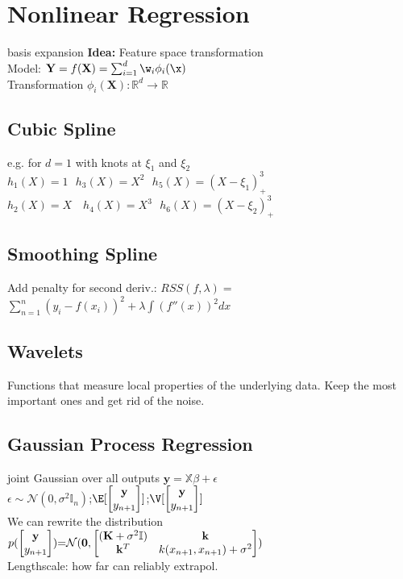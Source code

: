 \section*{Nonlinear Regression}
basis expansion
\textbf{Idea:} Feature space transformation\\
Model: $\mathbf{Y}=f(\mathbf{X})=\sum_{i=1}^d\w_i \phi_i(\x)$\\
Transformation $\phi_i(\mathbf{X}):\mathbb{R}^d \rightarrow \mathbb{R}$


\iffalse
\subsection*{Cubic Spline}
 e.g. for $d=1$ with knots at $\xi_1$ and $\xi_2$\\
 $h_1(X){=}1\ \ \ h_3(X){=}X^2\ \ \ h_5(X){=}(X{-}\xi_1)^3_+$ \ \ \
 $h_2(X){=}X \quad h_4(X){=}X^3\ \ \ h_6(X){=}(X{-}\xi_2)^3_+$

 \subsection*{Smoothing Spline}
 Add penalty for second deriv.:  
 $RSS(f, \lambda) {=}$
 $ \sum_{n=1}^n (y_i-f(x_i))^2 + \lambda\int (f''(x))^2 dx$
\subsection*{Wavelets}
 Functions that measure local properties of the underlying data. Keep the most important ones and get rid of the noise.


\subsection*{Gaussian Process Regression}
joint Gaussian over all outputs
$\mathbf{y}=\mathbb{X}\beta+\epsilon$\\  $\epsilon\sim \mathcal{N}(0,\sigma^2\mathbb{I}_n)$;$\E[\begin{bmatrix}
\mathbf{y}\\
y_{n+1}\\
\end{bmatrix}]$;$\V[\begin{bmatrix}
\mathbf{y}\\
y_{n+1}\\
\end{bmatrix}]$\\
We can rewrite the distribution
$p(\begin{bmatrix}
\mathbf{y}\\
y_{n+1}\\
\end{bmatrix})\\{=}\mathcal{N}(\mathbf{0},\begin{bmatrix}
(\mathbf{K}+\sigma^2\mathbb{I}) & \mathbf{k} \\
\mathbf{k}^T & k(x_{n+1},x_{n+1})+\sigma^2 \\
\end{bmatrix})$\\
Lengthscale: how far can reliably extrapol.
